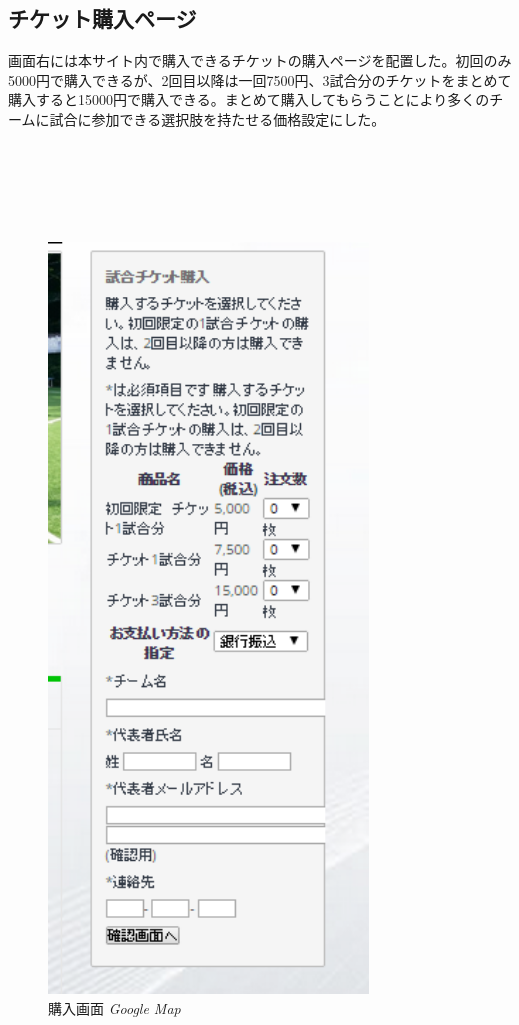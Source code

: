 \subsection{チケット購入ページ}
画面右には本サイト内で購入できるチケットの購入ページを配置した。初回のみ5000円で購入できるが、2回目以降は一回7500円、3試合分のチケットをまとめて購入すると15000円で購入できる。まとめて購入してもらうことにより多くのチームに試合に参加できる選択肢を持たせる価格設定にした。
\\
\\
\\
\\
\\
\\
\begin{figure}[htbp]
	\centering
	\includegraphics[width=85mm, bb=30 0 300 300]{figures/buy.jpg}
	\caption{購入画面 {\itshape Google Map}}
	\label{購入画面}
\end{figure}
\newpage



